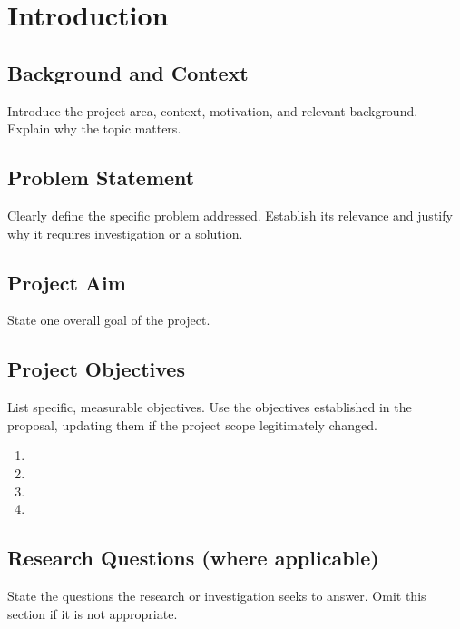 \documentclass[12pt,a4paper]{report}
\begin{document}
\clearpage


\chapter{Introduction}


\section{Background and Context}
Introduce the project area, context, motivation, and relevant background. Explain why the topic matters.

\section{Problem Statement}
Clearly define the specific problem addressed. Establish its relevance and justify why it requires investigation or a solution.

\section{Project Aim}
State one overall goal of the project.

\section{Project Objectives}
List specific, measurable objectives. Use the objectives established in the proposal, updating them if the project scope legitimately changed.

\begin{enumerate}
    \item [Objective 1]
    \item [Objective 2]
    \item [Objective 3]
    \item [Objective 4]
\end{enumerate}

\section{Research Questions (where applicable)}
State the questions the research or investigation seeks to answer. Omit this section if it is not appropriate.
\end{document}
